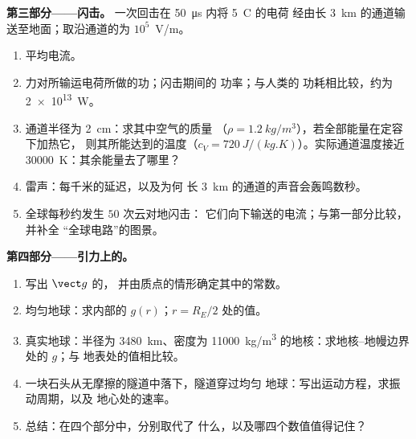 \begin{problem}
\medskip
\noindent\textbf{第三部分——闪击。}
一次回击在 \qty{50}{\micro s} 内将 \qty{5}{C} 的电荷
经由长 \qty{3}{km} 的通道输送至地面；取沿通道的为
$10^5$~V/m。
\begin{enumerate}[resume]
  \item 平均电流。
  \item {}力对所输运电荷所做的功；闪击期间的
        功率；与人类的
        功耗相比较，约为 \qty{2e13}{W}。
  \item 通道半径为 \qty{2}{cm}：求其中空气的质量
        （$\rho = \qty{1.2}{kg/m^3}$），若全部能量在定容下加热它，
        则其所能达到的温度（$c_V =
        \qty{720}{J/(kg.K)}$）。实际通道温度接近
        \qty{30000}{K}：其余能量去了哪里？
  \item 雷声：每千米的延迟，以及为何
        长 \qty{3}{km} 的通道的声音会轰鸣数秒。
  \item 全球每秒约发生 $50$ 次云对地闪击：
        它们向下输送的电流；与第一部分比较，并补全
        “全球电路”的图景。
\end{enumerate}

\medskip
\noindent\textbf{第四部分——引力上的。}
\begin{enumerate}[resume]
  \item 写出 $\vect g$ 的，
        并由质点的情形确定其中的常数。
  \item 均匀地球：求内部的 $g(r)$；$r = R_E/2$ 处的值。
  \item 真实地球：半径为 \qty{3480}{km}、密度为
        \qty{11000}{kg/m^3} 的地核：求地核–地幔边界处的 $g$；与
        地表处的值相比较。
  \item 一块石头从无摩擦的隧道中落下，隧道穿过均匀
        地球：写出运动方程，求振动周期，以及
        地心处的速率。
  \item 总结：在四个部分中，分别取代了
        什么，以及哪四个数值值得记住？
\end{enumerate}
\end{problem}
